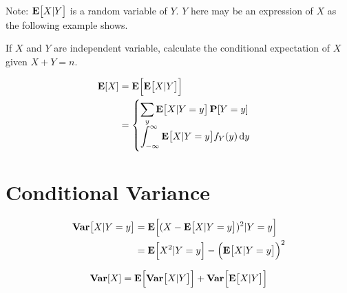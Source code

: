 Note: $\expect{X|Y}$ is a random variable of $Y$. $Y$ here may be an expression of $X$ as the following example shows.

\begin{example}
    If $X$ and $Y$ are independent variable, calculate the conditional expectation of $X$ given $X+Y=n$.
\end{example}


\begin{theorem}
    \begin{equation}
        \begin{aligned}
            \expect{X} &= \expect{ \expect{X|Y}} \\
            &= \begin{cases}
                \displaystyle \sum_y \expect{X|Y = y} \probability{Y=y} \\
                \displaystyle \int_{-\infty}^\infty \expect{X|Y=y} f_Y (y) \dif{y}
            \end{cases}
        \end{aligned}
    \end{equation}
\end{theorem}





\section{Conditional Variance}

\begin{theorem}
    \begin{equation}
    \begin{aligned}
        \variance{X|Y=y} &= \expect{(X - \expect{X|Y=y})^2 | Y=y} \\
        &= \expect{X^2|Y=y}- \mleft(\expect{X|Y=y} \mright)^2
    \end{aligned}
    \end{equation}
\end{theorem}

\begin{theorem}
 \begin{equation}
        \variance{X} = \expect{\variance{X|Y}} + \variance{\expect{X|Y}}
    \end{equation}    
\end{theorem}







